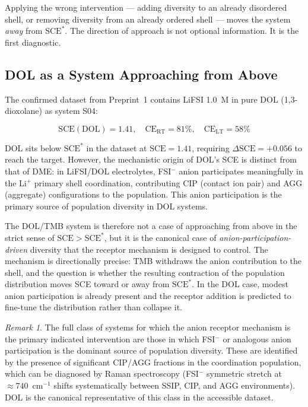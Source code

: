 \documentclass[11pt]{article}
\theoremstyle{plain}
\theoremstyle{definition}
\theoremstyle{remark}
\newtheorem{remark}{Remark}[section]
\begin{document}
Applying the wrong intervention --- adding diversity to an already
disordered shell, or removing diversity from an already ordered shell
--- moves the system \emph{away} from $\mathrm{SCE}^{*}$.  The direction
of approach is not optional information.  It is the first diagnostic.

\subsection{DOL as a System Approaching from Above}

The confirmed dataset from Preprint~1 contains LiFSI 1.0~M in pure DOL
(1,3-dioxolane) as system S04:

\begin{equation}
  \mathrm{SCE}(\mathrm{DOL}) = 1.41, \quad
  \mathrm{CE}_{\mathrm{RT}} = 81\%, \quad
  \mathrm{CE}_{\mathrm{LT}} = 58\%
  \label{eq:DOL_baseline}
\end{equation}

DOL sits below $\mathrm{SCE}^{*}$ in the dataset at $\mathrm{SCE} = 1.41$,
requiring $\Delta\mathrm{SCE} = +0.056$ to reach the target.  However,
the mechanistic origin of DOL's SCE is distinct from that of DME: in
LiFSI/DOL electrolytes, FSI$^-$ anion participates meaningfully in the
Li$^+$ primary shell coordination, contributing CIP (contact ion pair)
and AGG (aggregate) configurations to the population.  This anion
participation is the primary source of population diversity in DOL
systems.

The DOL/TMB system is therefore not a case of approaching from above
in the strict sense of $\mathrm{SCE} > \mathrm{SCE}^{*}$, but it is
the canonical case of \emph{anion-participation-driven} diversity that
the receptor mechanism is designed to control.  The mechanism is
directionally precise: TMB withdraws the anion contribution to the
shell, and the question is whether the resulting contraction of the
population distribution moves SCE toward or away from $\mathrm{SCE}^{*}$.
In the DOL case, modest anion participation is already present and the
receptor addition is predicted to fine-tune the distribution rather than
collapse it.

\begin{remark}
The full class of systems for which the anion receptor mechanism is the
primary indicated intervention are those in which FSI$^-$ or analogous
anion participation is the dominant source of population diversity.
These are identified by the presence of significant CIP/AGG fractions
in the coordination population, which can be diagnosed by Raman
spectroscopy (FSI$^-$ symmetric stretch at $\approx 740$~cm$^{-1}$
shifts systematically between SSIP, CIP, and AGG environments).
DOL is the canonical representative of this class in the accessible
dataset.
\end{remark}
\end{document}

